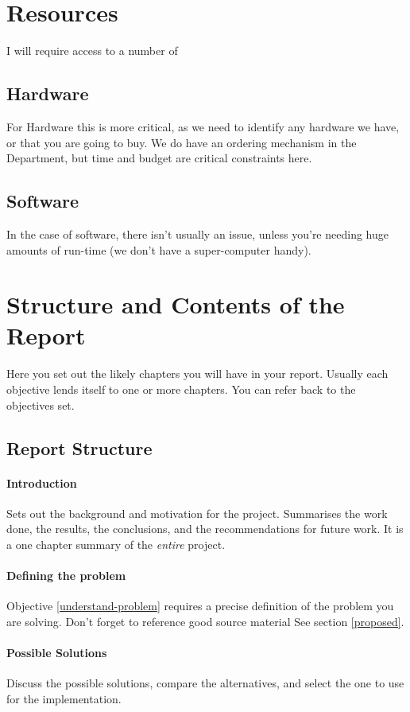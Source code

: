 \section{Resources}
I will require access to a number of 

\subsection{Hardware}
For Hardware this is more critical, as we need to identify any hardware we have, or that you are going to buy.  We do have an ordering mechanism in the Department, but time and budget are critical constraints here.

\subsection{Software}
In the case of software, there isn't usually an issue, unless you're needing huge amounts of run-time (we don't have a super-computer handy).

\section{Structure and Contents of the Report}
Here you set out the likely chapters you will have in your report.  Usually each objective lends itself to one or more chapters.  You can refer back to the objectives set.
\subsection{Report Structure}

\paragraph{Introduction}  Sets out the background and motivation for the project.  Summarises the work done, the results, the conclusions, and the recommendations for future work.  It is a one chapter summary of the \emph{entire} project.

\paragraph{Defining the problem}  Objective \ref{understand-problem} requires a precise definition of the problem you are solving.  Don't forget to reference good source material  See section \ref{proposed}.

\paragraph{Possible Solutions} Discuss the possible solutions, compare the
alternatives, and select the one to use for the  implementation.

